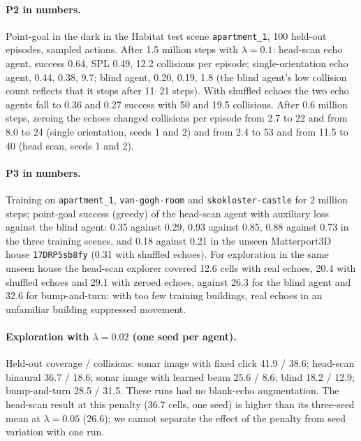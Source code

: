 \paragraph{P2 in numbers.} Point-goal in the dark in the Habitat test scene \texttt{apartment\_1}, 100 held-out episodes, sampled actions. After 1.5 million steps with $\lambda=0.1$: head-scan echo agent, success 0.64, SPL 0.49, 12.2 collisions per episode; single-orientation echo agent, 0.44, 0.38, 9.7; blind agent, 0.20, 0.19, 1.8 (the blind agent's low collision count reflects that it stops after 11--21 steps). With shuffled echoes the two echo agents fall to 0.36 and 0.27 success with 50 and 19.5 collisions. After 0.6 million steps, zeroing the echoes changed collisions per episode from 2.7 to 22 and from 8.0 to 24 (single orientation, seeds 1 and 2) and from 2.4 to 53 and from 11.5 to 40 (head scan, seeds 1 and 2).
\paragraph{P3 in numbers.} Training on \texttt{apartment\_1}, \texttt{van-gogh-room} and \texttt{skokloster-castle} for 2 million steps; point-goal success (greedy) of the head-scan agent with auxiliary loss against the blind agent: 0.35 against 0.29, 0.93 against 0.85, 0.88 against 0.73 in the three training scenes, and 0.18 against 0.21 in the unseen Matterport3D house \texttt{17DRP5sb8fy} (0.31 with shuffled echoes). For exploration in the same unseen house the head-scan explorer covered 12.6 cells with real echoes, 20.4 with shuffled echoes and 29.1 with zeroed echoes, against 26.3 for the blind agent and 32.6 for bump-and-turn: with too few training buildings, real echoes in an unfamiliar building suppressed movement.
\paragraph{Exploration with $\lambda=0.02$ (one seed per agent).} Held-out coverage / collisions: sonar image with fixed click 41.9 / 38.6; head-scan binaural 36.7 / 18.6; sonar image with learned beam 25.6 / 8.6; blind 18.2 / 12.9; bump-and-turn 28.5 / 31.5. These runs had no blank-echo augmentation. The head-scan result at this penalty (36.7 cells, one seed) is higher than its three-seed mean at $\lambda=0.05$ (26.6); we cannot separate the effect of the penalty from seed variation with one run.

